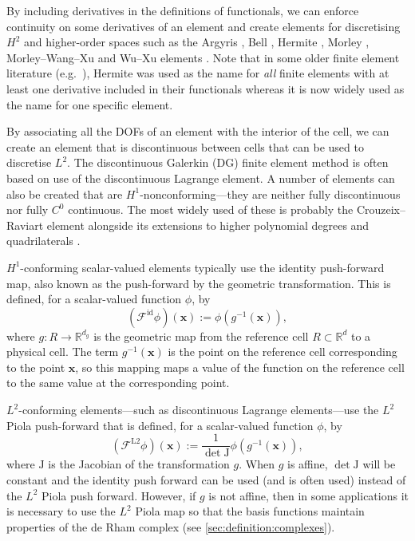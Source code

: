\documentclass[sn-mathphys-num]{sn-jnl}%
\theoremstyle{thmstyleone}%
\newcommand{\refel}{R}
\newcommand{\mat}[1]{\boldsymbol{\mathrm{#1}}}
\renewcommand{\vec}[1]{\boldsymbol{#1}}
\newcommand{\mapping}{\mathcal{F}}
\newcommand{\geometrymap}{g}
\newcommand{\jacobian}{\mat{J}}
\newcommand{\inv}{^{-1}}
\theoremstyle{thmstyletwo}%
\theoremstyle{thmstylethree}%
\begin{document}
By including derivatives in the definitions of functionals, we can enforce continuity on some derivatives of an element and create elements for
discretising $H^2$ and higher-order spaces such as the Argyris \cite{argyris}, Bell \cite{bell}, Hermite \cite{hermite}, Morley \cite{morley}, Morley--Wang--Xu \cite{morley-wang-xu} and Wu--Xu elements \cite{wu-xu}.
Note that in some older finite element literature (e.g.~\cite{ciarlet}), Hermite was used as the name for \emph{all} finite elements with at least one derivative
included in their functionals whereas it is now widely used as the name for one specific element.

By associating all the DOFs of an element with the interior of the cell, we can create an element that is discontinuous between cells that can be used to
discretise $L^2$.
The discontinuous Galerkin (DG) finite element method \cite{arnold-dg,Reed1973Triangular} is often based on use of the discontinuous Lagrange element.
A number of elements can also be created that are $H^1$-nonconforming---they are neither fully discontinuous nor fully $C^0$ continuous. The most widely used of these is probably the
Crouzeix--Raviart \cite{crouzeix-raviart} element alongside its extensions to higher polynomial degrees and quadrilaterals \cite{crouzeix-falk,fortin-soulie,rannacher-turek}.

$H^1$-conforming scalar-valued elements typically use the identity push-forward map, also known as the push-forward by the geometric transformation. This is defined, for a scalar-valued function $\phi$, by
$$\left(\mapping^\text{id}\phi\right)(\vec{x})
:=\phi(\geometrymap\inv(\vec{x})),$$
where $\geometrymap:\refel\to\mathbb{R}^{d_g}$ is the geometric map from the reference cell $\refel\subset\mathbb{R}^d$ to a physical cell.
The term \(\geometrymap\inv(\vec{x})\) is the point on the reference cell corresponding to the point \(\vec{x}\), so this mapping
maps a value of the function on the reference cell to the same value at the corresponding point.

$L^2$-conforming elements---such as discontinuous Lagrange elements---use the $L^2$ Piola push-forward that is defined, for a scalar-valued function $\phi$, by
$$\left(\mapping^\text{L2}\phi\right)(\vec{x})
:=\frac1{\det \jacobian}\phi(\geometrymap\inv(\vec{x})),$$
where $\jacobian$ is the Jacobian of the transformation $\geometrymap$.
When $\geometrymap$ is affine, $\det\jacobian$ will be constant and the identity push forward
can be used (and is often used) instead of the $L^2$ Piola push forward.
However, if $\geometrymap$ is not affine, then in some applications it is necessary to use the $L^2$ Piola map
so that the basis functions maintain properties of the de Rham complex (see \cref{sec:definition:complexes}).
\end{document}
